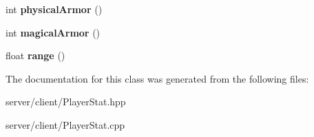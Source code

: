 \begin{DoxyCompactItemize}
\item 
\hypertarget{class_player_stat_a7f957103e08d4aa83110c8a04a9bfbc5}{int {\bfseries physical\-Armor} ()}\label{class_player_stat_a7f957103e08d4aa83110c8a04a9bfbc5}

\item 
\hypertarget{class_player_stat_aebb5125b78c8b7690bf7eadf50e0c9aa}{int {\bfseries magical\-Armor} ()}\label{class_player_stat_aebb5125b78c8b7690bf7eadf50e0c9aa}

\item 
\hypertarget{class_player_stat_a665408e892ea83babef4a4c1f9f41364}{float {\bfseries range} ()}\label{class_player_stat_a665408e892ea83babef4a4c1f9f41364}

\end{DoxyCompactItemize}


The documentation for this class was generated from the following files\-:\begin{DoxyCompactItemize}
\item 
server/client/Player\-Stat.\-hpp\item 
server/client/Player\-Stat.\-cpp\end{DoxyCompactItemize}
